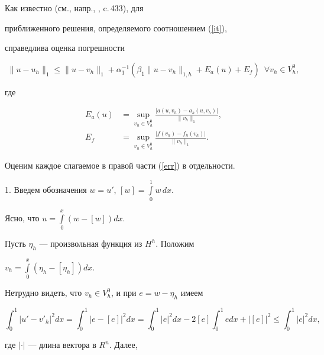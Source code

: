 \begin{pf}


Как известно (см., напр., \cite{Ciarlet}, c.\,433), для


приближенного решения, определяемого соотношением (\ref{it}),


справедлива оценка погрешности


\begin{equation} \label{err}


\|u-u_h\|_{1} \le


\|u-v_h\|_{1}+\alpha_1^{-1}\left(\beta_1 \|u-v_h\|_{1,h}+


E_a(u)+E_f \right) \ \; \forall v_h\in V_h^0,


\end{equation}


где


\begin{align*}


E_a(u)&=\sup_{v_h\in V_h^0} \frac{|a(u,v_h) -


a_h(u,v_h)|}{\|v_h\|_{1}}, \\


%


E_f&=\sup_{v_h\in V_h^0} \frac{|f(v_h) -


f_h(v_h)|}{\|v_h\|_{1}}.


\end{align*}


Оценим каждое слагаемое в правой части (\ref{err}) в отдельности.





1. Введем обозначения $w=u'$, $[w]=\int\limits_{0}^{1} w\,dx$.


Ясно, что $u=\int\limits_{0}^{x} (w-[w]) dx$.


Пусть $\eta_h$ --- произвольная функция из $H^h$. Положим


$v_h=\int\limits_{0}^{x} (\eta_h-[\eta_h]) dx$.


Нетрудно видеть, что $v_h \in V_h^0 $, и при $e=w-\eta_h$ имеем


$$


\int _{0}^{1}|u'-v'_h|^2 dx= \int _{0}^{1} |e-[e]|^2 dx


=\int _{0}^{1}|e|^2 dx-2 [e] \int _{0}^{1}e dx+|[e]|^2 \le


\int_{0}^{1}|e|^2 dx,


$$


где $|\cdot|$ --- длина вектора в $R^n$. Далее,


$$



\end{pf}
